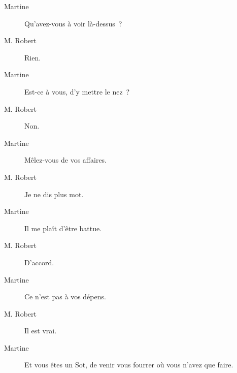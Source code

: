 \documentclass[french,twoside]{book} %
\begin{document}
 \begin{description} \item[Martine] 

Qu’avez-vous à voir là-dessus ?\end{description}
 \begin{description} \item[M. Robert] 

Rien.\end{description}
 \begin{description} \item[Martine] 

Est-ce à vous, d’y mettre le nez ?\end{description}
 \begin{description} \item[M. Robert] 

Non.\end{description}
 \begin{description} \item[Martine] 

Mêlez-vous de vos affaires.\end{description}
 \begin{description} \item[M. Robert] 

Je ne dis plus mot.\end{description}
 \begin{description} \item[Martine] 

Il me plaît d’être battue.\end{description}
 \begin{description} \item[M. Robert] 

D’accord.\end{description}
 \begin{description} \item[Martine] 

Ce n’est pas à vos dépens.\end{description}
 \begin{description} \item[M. Robert] 

Il est vrai.\end{description}
 \begin{description} \item[Martine] 

Et vous êtes un Sot, de venir vous fourrer où vous n’avez que faire.\end{description}
\end{document}
